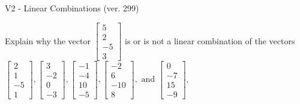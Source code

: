 \begin{exercise}
  \begin{exerciseTitle}V2 - Linear Combinations (ver. 299)\end{exerciseTitle}
  \begin{exerciseStatement}
    Explain why the vector \(\left[\begin{array}{c}
5 \\
2 \\
-5 \\
3
\end{array}\right]\)  is or is not a linear 
	combination of the vectors \(\left[\begin{array}{c}
2 \\
1 \\
-5 \\
1
\end{array}\right] , \left[\begin{array}{c}
3 \\
-2 \\
0 \\
-3
\end{array}\right] , \left[\begin{array}{c}
-1 \\
-4 \\
10 \\
-5
\end{array}\right] , \left[\begin{array}{c}
-2 \\
6 \\
-10 \\
8
\end{array}\right] , \text{ and } \left[\begin{array}{c}
0 \\
-7 \\
15 \\
-9
\end{array}\right]\).
	



\end{exerciseStatement}
\end{exercise}
